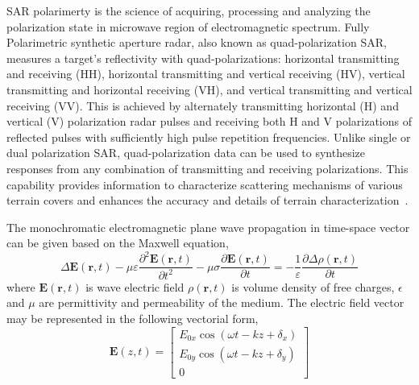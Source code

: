 SAR polarimerty is the science of acquiring, processing and analyzing the polarization state in microwave region of electromagnetic spectrum. Fully Polarimetric synthetic aperture radar, also known as quad-polarization SAR, measures a target’s reflectivity with quad-polarizations: horizontal transmitting and receiving ($\mbox{HH}$), horizontal transmitting and vertical receiving ($\mbox{HV}$), vertical transmitting and horizontal receiving ($\mbox{VH}$), and vertical transmitting and vertical receiving ($\mbox{VV}$). This is achieved by alternately transmitting horizontal (H) and vertical (V) polarization radar pulses and receiving both H and V polarizations of reflected pulses with sufficiently high pulse repetition frequencies. Unlike single or dual polarization SAR, quad-polarization data can be used to synthesize responses from any combination of transmitting and receiving polarizations. This capability provides information to characterize scattering mechanisms of various terrain covers and enhances the accuracy and details of terrain characterization~\citep{ulaby1990radar}.

The monochromatic electromagnetic plane wave propagation in time-space vector can be given based on the Maxwell equation, 
\begin{equation}
\Delta\mathbf{E}(\mathbf{r},t)-\mu\varepsilon\frac{\partial^2 \mathbf{E}(\mathbf{r}, t) }{\partial t^2}-\mu\sigma\frac{\partial \mathbf{E}(\mathbf{r}, t) }{\partial t}=-\frac{1}{\varepsilon}\frac{\partial \Delta\rho(\mathbf{r}, t) }{\partial t}
\end{equation}
where $\mathbf{E}(\mathbf{r},t)$ is wave electric field $\rho(\mathbf{r}, t)$ is volume density of free charges, $\epsilon$ and $\mu$ are permittivity and permeability of the medium. The electric field vector may be represented in the following vectorial form, 
\begin{equation}
\mathbf{E}(z,t)=
\left[\begin{array}{c}
E_{0x}\cos(\omega t-kz+\delta_{x})\\
E_{0y}\cos(\omega t-kz+\delta_{y})\\
0
\end{array}\right]
\end{equation}
